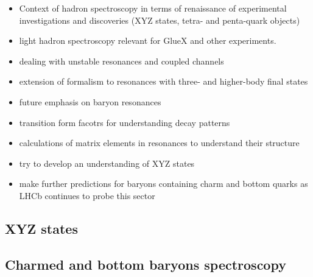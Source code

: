 
\begin{itemize}
	\item Context of hadron spectroscopy in terms of renaissance of experimental investigations and discoveries (XYZ states, tetra- and penta-quark objects)
	\item light hadron spectroscopy relevant for GlueX and other experiments. 
	\item dealing with unstable resonances and coupled channels
	\item extension of formalism to resonances with  three- and higher-body final states
	\item future emphasis on baryon resonances
	\item transition form facotrs for understanding decay patterns
	\item calculations of matrix elements in resonances to understand their structure
	\item try to develop an understanding of XYZ states
	\item make further predictions for baryons containing charm and bottom quarks as LHCb continues to probe this sector
\end{itemize}











\subsection{XYZ states}

\subsection{Charmed and bottom baryons spectroscopy} 







